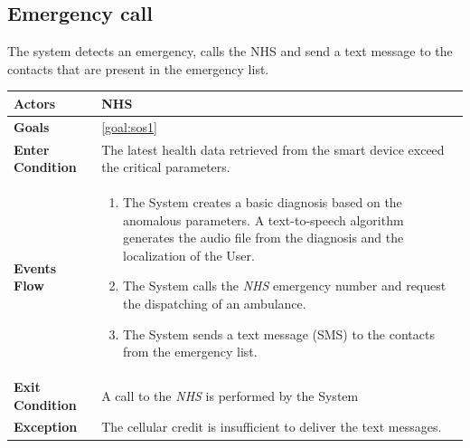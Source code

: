   \subsection{Emergency call}
The system detects an emergency, calls the NHS and send a text message to the contacts that are present in the emergency list.

\begin{table}[H]
	\centering
    
    \begin{tabular}{|p{3.5cm}|p{10.3cm}|}
    
    \hline
    \textbf{\large{Actors}}  			& NHS						     \\
    				 					
    \hline
    \textbf{\large{Goals}} 				& \ref{goal:sos1}                \\
    
    \hline
    \textbf{\large{Enter Condition}}	& The latest health data retrieved from the smart device exceed the critical parameters.		\\
    
    \hline
    \textbf{\large{Events Flow}}		& \begin{enumerate}[leftmargin=0.5cm]
                                          	\item The System creates a basic diagnosis based on the anomalous parameters. A text-to-speech algorithm generates the audio file from the diagnosis and the localization of the User.
                                            \item The System calls the \emph{NHS} emergency number and request the dispatching of an ambulance.
                                            \item The System sends a text message (SMS) to the contacts from the emergency list.
                                      \end{enumerate}
    										\\
    \hline
    \textbf{\large{Exit Condition}} 	& A call to the \emph{NHS} is performed by the System \\
    
    \hline
    \textbf{\large{Exception}} 			& The cellular credit is insufficient to deliver the text messages.\\
    								
    \hline
    
    \end{tabular}
	
\end{table}
